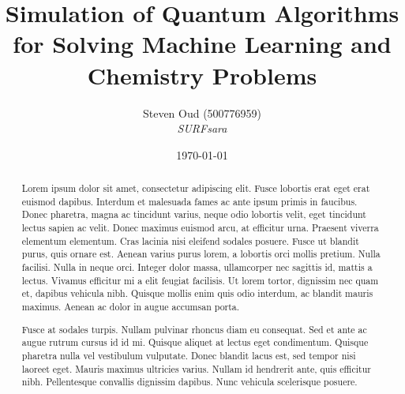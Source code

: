 \documentclass[a4paper,12pt]{article}
\title{Simulation of Quantum Algorithms for Solving Machine Learning and Chemistry Problems}
\author{Steven Oud (500776959) \\ \emph{SURFsara}}
\date{\today}
\begin{document}
\maketitle

\begin{abstract}
Lorem ipsum dolor sit amet, consectetur adipiscing elit. Fusce lobortis erat eget erat euismod dapibus. Interdum et malesuada fames ac ante ipsum primis in faucibus. Donec pharetra, magna ac tincidunt varius, neque odio lobortis velit, eget tincidunt lectus sapien ac velit. Donec maximus euismod arcu, at efficitur urna. Praesent viverra elementum elementum. Cras lacinia nisi eleifend sodales posuere. Fusce ut blandit purus, quis ornare est. Aenean varius purus lorem, a lobortis orci mollis pretium. Nulla facilisi. Nulla in neque orci. Integer dolor massa, ullamcorper nec sagittis id, mattis a lectus. Vivamus efficitur mi a elit feugiat facilisis. Ut lorem tortor, dignissim nec quam et, dapibus vehicula nibh. Quisque mollis enim quis odio interdum, ac blandit mauris maximus. Aenean ac dolor in augue accumsan porta.

Fusce at sodales turpis. Nullam pulvinar rhoncus diam eu consequat. Sed et ante ac augue rutrum cursus id id mi. Quisque aliquet at lectus eget condimentum. Quisque pharetra nulla vel vestibulum vulputate. Donec blandit lacus est, sed tempor nisi laoreet eget. Mauris maximus ultricies varius. Nullam id hendrerit ante, quis efficitur nibh. Pellentesque convallis dignissim dapibus. Nunc vehicula scelerisque posuere.
\end{abstract}
\end{document}
